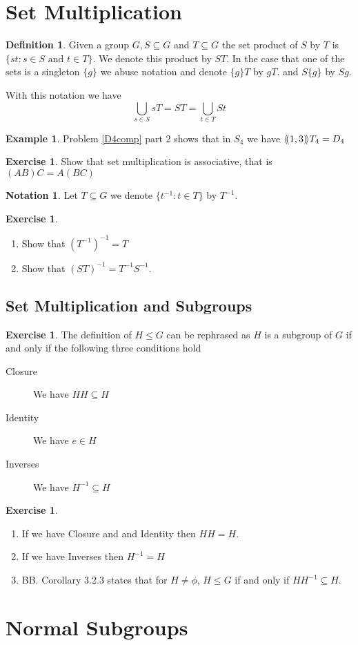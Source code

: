 \documentclass[12pt]{amsart}
\newcommand{\benu}{\begin{enumerate}}
\newcommand{\eenu}{\end{enumerate}}
\newcommand{\bed}{\begin{description}}
\newcommand{\ed}{\end{description}}
\theoremstyle{definition}
\newtheorem{notation}[theorem]{Notation}
\newcommand{\bnot}{\begin{notation}}
\newcommand{\enot}{\end{notation}}
\newtheorem{exercise}[theorem]{Exercise}
\newcommand{\bex}{\begin{exercise}}
\newcommand{\ex}{\end{exercise}}
\newtheorem{definition}[theorem]{Definition}
\newcommand{\bdf}{\begin{definition}}
\newcommand{\edf}{\end{definition}}
\newtheorem{example}[theorem]{Example}
\newcommand{\bax}{\begin{example}}
\newcommand{\ax}{\end{example}}
\newcommand{\nts}{\negthinspace}
\newcommand{\gen}[1]{\langle \nts#1 \nts\rangle}
\begin{document}
\section{Set Multiplication}

\bdf Given a group $G,S\subseteq G$ and $T\subseteq G$ the set product of $S$ by $T$ is $\{st:s\in S \text{ and }t\in T\}$. We denote this 
product  by $ST$. In the case that one of the sets is a singleton $\{g\}$ we abuse notation and denote $\{g\}T$ by $gT$. and $S\{g\}$ by $Sg$. 
\edf
With this notation we have 
\[\bigcup_{s\in S}sT=ST=\bigcup_{t\in T}St
\]
\bax Problem \ref{D4comp} part 2 shows that in $S_4$ we have $\gen{(1,3)}T_4=D_4$
\ax
\bex \label{associativity} Show that set multiplication is associative, that is $(AB)C=A(BC)$
\ex

\bnot Let $T\subseteq G$ we denote $\{t^{-1}:t\in T\}$ by $T^{-1}$.
\enot

\bex \hfill
\benu
\item \label{invinv} 
Show that $(T^{-1})^{-1}=T$
\item Show that $(ST)^{-1}=T^{-1}S^{-1}$.
\eenu
\ex






\subsection{Set Multiplication and Subgroups}



\bex
 The definition of $H\leq G$ can be rephrased as
$H$ is a subgroup of $G$ if and only if the following three conditions hold
\bed
\item[Closure] We have $HH\subseteq H$
\item[Identity] We have $e\in H$
\item[Inverses] We have $H^{-1}\subseteq H$
\ed
\ex
\bex \hfill
\benu
\item If we have Closure and and Identity then $HH=H$.
\item If we have Inverses then $H^{-1}=H$
\item BB. Corollary 3.2.3 states that for $H\neq \phi$, $H\leq G$ if and only if $HH^{-1}\subseteq H$.
\eenu
\ex





\section{Normal Subgroups}
\end{document}
